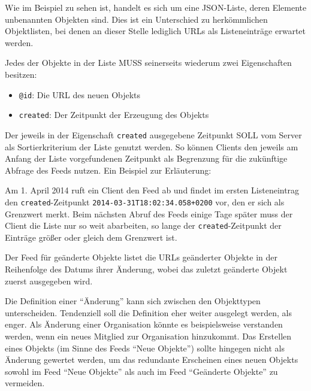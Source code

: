 \documentclass[,a4paper]{article}
\begin{document}
Wie im Beispiel zu sehen ist, handelt es sich um eine JSON-Liste, deren
Elemente unbenannten Objekten sind. Dies ist ein Unterschied zu
herkömmlichen Objektlisten, bei denen an dieser Stelle lediglich URLs
als Listeneinträge erwartet werden.

Jedes der Objekte in der Liste MUSS seinerseits wiederum zwei
Eigenschaften besitzen:

\begin{itemize}
\itemsep1pt\parskip0pt
\item
  \texttt{@id}: Die URL des neuen Objekts
\item
  \texttt{created}: Der Zeitpunkt der Erzeugung des Objekts
\end{itemize}

Der jeweils in der Eigenschaft \texttt{created} ausgegebene Zeitpunkt
SOLL vom Server als Sortierkriterium der Liste genutzt werden. So können
Clients den jeweils am Anfang der Liste vorgefundenen Zeitpunkt als
Begrenzung für die zukünftige Abfrage des Feeds nutzen. Ein Beispiel zur
Erläuterung:

Am 1. April 2014 ruft ein Client den Feed ab und findet im ersten
Listeneintrag den \texttt{created}-Zeitpunkt
\texttt{2014-03-31T18:02:34.058+0200} vor, den er sich als Grenzwert
merkt. Beim nächsten Abruf des Feeds einige Tage später muss der Client
die Liste nur so weit abarbeiten, so lange der
\texttt{created}-Zeitpunkt der Einträge größer oder gleich dem Grenzwert
ist.


Der Feed für geänderte Objekte listet die URLs geänderter Objekte in der
Reihenfolge des Datums ihrer Änderung, wobei das zuletzt geänderte
Objekt zuerst ausgegeben wird.

Die Definition einer ``Änderung'' kann sich zwischen den Objekttypen
unterscheiden. Tendenziell soll die Definition eher weiter ausgelegt
werden, als enger. Als Änderung einer Organisation könnte es
beispielsweise verstanden werden, wenn ein neues Mitglied zur
Organisation hinzukommt. Das Erstellen eines Objekts (im Sinne des Feeds
``Neue Objekte'') sollte hingegen nicht als Änderung gewertet werden, um
das redundante Erscheinen eines neuen Objekts sowohl im Feed ``Neue
Objekte'' als auch im Feed ``Geänderte Objekte'' zu vermeiden.
\end{document}
